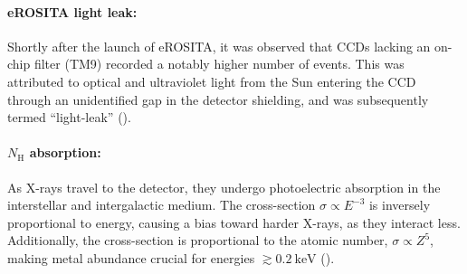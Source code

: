 \paragraph*{eROSITA light leak:} Shortly after the launch of eROSITA, it was observed that CCDs lacking an on-chip filter (TM9) recorded a notably higher number of events. This was attributed to optical and ultraviolet light from the Sun entering the CCD through an unidentified gap in the detector shielding, and was subsequently termed \enquote{light-leak} (\cite{Predehl2021}).
\paragraph*{\(N_\text{H}\) absorption:} 
As X-rays travel to the detector, they undergo photoelectric absorption in the interstellar and intergalactic medium. The cross-section \(\sigma \propto E^{-3}\) is inversely proportional to energy, causing a bias toward harder X-rays, as they interact less. Additionally, the cross-section is proportional to the atomic number, \(\sigma \propto Z^5\), making metal abundance crucial for energies \(\gtrsim \SI{0.2}{\kilo\electronvolt}\) (\cite{Willingale2013}).

